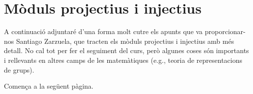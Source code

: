 \documentclass[../main.tex]{subfiles}
\begin{document}







\appendix

\newpage
\chapter{Mòduls projectius i injectius}
A continuació adjuntaré d'una forma molt cutre els apunts que va proporcionar-nos Santiago Zarzuela, que tracten els mòduls projectius i injectius amb més detall. No cal tot per fer el seguiment del curs, però algunes coses són importants i rellevants en altres camps de les matemàtiques (e.g., teoria de representacions de grups). 

Comença a la següent pàgina.
\end{document}
